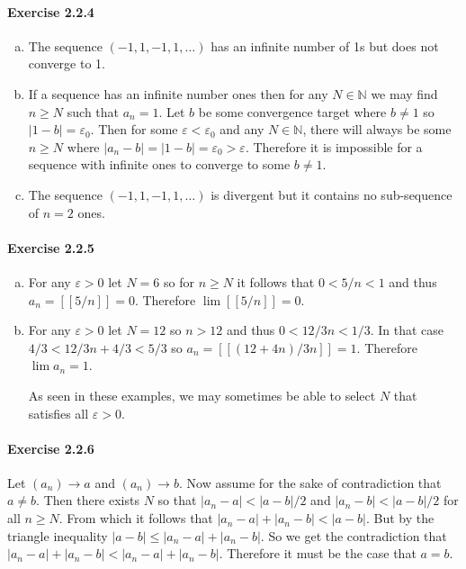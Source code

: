 \documentclass{article}
\newcommand{\N}{\mathbb{N}}
\begin{document}
\paragraph{Exercise 2.2.4}
\begin{enumerate}[(a)]
	\item 
	The sequence $(-1,1,-1,1,\ldots)$ has an infinite number of 1s but does not converge to 1.

	\item
	If a sequence has an infinite number ones then for any $N \in \N$ we may find $n \geq N$ such that $a_n = 1$.
	Let $b$ be some convergence target where $b \neq 1$ so $|1 - b| = \varepsilon_0$.
	Then for some $\varepsilon < \varepsilon_0$ and any $N\in \N$, there will always be some $n \geq N$ where $|a_n - b| = |1 - b| = \varepsilon_0 > \varepsilon$.
	Therefore it is impossible for a sequence with infinite ones to converge to some $b \neq 1$.

	\item
	The sequence $(-1,1,-1,1,\ldots)$ is divergent but it contains no sub-sequence of $n=2$ ones. 
\end{enumerate}

\paragraph{Exercise 2.2.5}
\begin{enumerate}[(a)]
	\item 
	For any $\varepsilon > 0$ let $N = 6$ so for $n\geq N$ it follows that $0 < 5/n < 1$ and thus $a_n = [[5/n]] = 0$.
	Therefore $\lim [[5/n]] = 0$.

	\item
	For any $\varepsilon > 0$ let $N = 12$ so $n > 12$ and thus $0 < 12/3n < 1/3$.
	In that case $4/3 < 12/3n + 4/3 < 5/3$ so $a_n = [[(12+4n)/3n]] = 1$.
	Therefore $\lim a_n = 1$.

	As seen in these examples, we may sometimes be able to select $N$ that satisfies all $\varepsilon > 0$.
\end{enumerate}

\paragraph{Exercise 2.2.6}
	Let $(a_n) \to a$ and $(a_n) \to b$.
	Now assume for the sake of contradiction that $a \neq b$.
	Then there exists $N$ so that $|a_n - a| < |a-b|/2$ and $|a_n - b| < |a-b|/2$ for all $n \geq N$.
	From which it follows that $|a_n - a| + |a_n -b| < |a-b|$.
	But by the triangle inequality $|a-b| \leq |a_n-a| + |a_n-b|$.
	So we get the contradiction that $|a_n - a| + |a_n -b| <  |a_n-a| + |a_n-b|$.
Therefore it must be the case that $a=b$.
\end{document}
